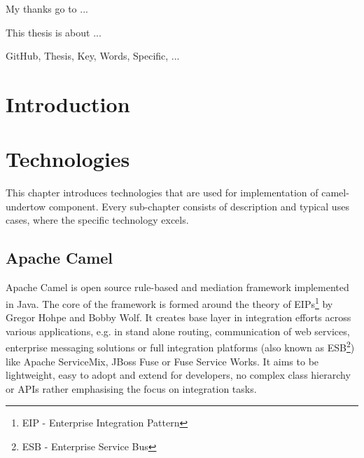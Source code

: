 \documentclass[11pt,draft,oneside]{fithesis2}
\begin{document}
\FrontMatter
\ThesisTitlePage

\begin{ThesisDeclaration}
  \DeclarationText
  \AdvisorName
\end{ThesisDeclaration}

\begin{ThesisThanks}
My thanks go to ... 
\end{ThesisThanks}

\begin{ThesisAbstract}
This thesis is about ...
\end{ThesisAbstract}

\begin{ThesisKeyWords}
GitHub, Thesis, Key, Words, Specific, ...
\end{ThesisKeyWords}

\MainMatter

\tableofcontents

\chapter{Introduction}

\chapter{Technologies}
This chapter introduces technologies that are used for implementation of camel-undertow component. Every sub-chapter consists of description and typical uses cases, where the specific technology excels.

\section{Apache Camel}
Apache Camel is open source rule-based and mediation framework implemented in Java. The core of the framework is formed around the theory of EIPs\footnote{EIP - Enterprise Integration Pattern} by Gregor Hohpe and Bobby Wolf. It creates base layer in integration efforts across various applications, e.g. in stand alone routing, communication of web services, enterprise messaging solutions or full integration platforms (also known as ESB\footnote{ESB - Enterprise Service Bus}) like Apache ServiceMix, JBoss Fuse or Fuse Service Works. It aims to be lightweight, easy to adopt and extend for developers, no complex class hierarchy or APIs rather emphasising the focus on integration tasks.
\end{document}

